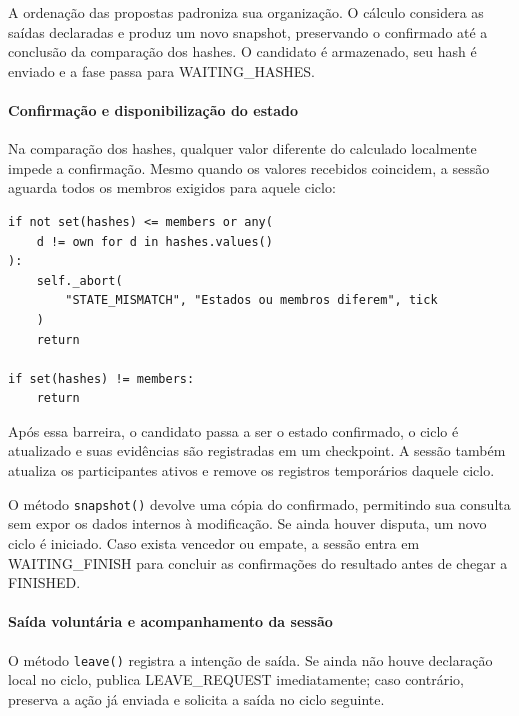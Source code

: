 \documentclass[11pt,a4paper]{article}
\begin{document}
A ordenação das propostas padroniza sua organização. O cálculo considera as saídas declaradas e produz um novo snapshot, preservando o confirmado até a conclusão da comparação dos hashes. O candidato é armazenado, seu hash é enviado e a fase passa para WAITING\_HASHES.

\paragraph{Confirmação e disponibilização do estado}

Na comparação dos hashes, qualquer valor diferente do calculado localmente impede a confirmação. Mesmo quando os valores recebidos coincidem, a sessão aguarda todos os membros exigidos para aquele ciclo:

\par\smallskip
\noindent
\begin{minipage}{\linewidth}
\begin{verbatim}
if not set(hashes) <= members or any(
    d != own for d in hashes.values()
):
    self._abort(
        "STATE_MISMATCH", "Estados ou membros diferem", tick
    )
    return

if set(hashes) != members:
    return
\end{verbatim}
\end{minipage}
\par\smallskip

Após essa barreira, o candidato passa a ser o estado confirmado, o ciclo é atualizado e suas evidências são registradas em um checkpoint. A sessão também atualiza os participantes ativos e remove os registros temporários daquele ciclo.

O método \texttt{snapshot()} devolve uma cópia do confirmado, permitindo sua consulta sem expor os dados internos à modificação. Se ainda houver disputa, um novo ciclo é iniciado. Caso exista vencedor ou empate, a sessão entra em WAITING\_FINISH para concluir as confirmações do resultado antes de chegar a FINISHED.

\paragraph{Saída voluntária e acompanhamento da sessão}

O método \texttt{leave()} registra a intenção de saída. Se ainda não houve declaração local no ciclo, publica LEAVE\_REQUEST imediatamente; caso contrário, preserva a ação já enviada e solicita a saída no ciclo seguinte.
\end{document}
